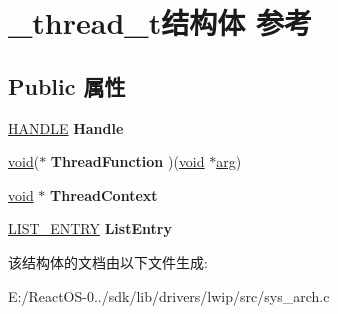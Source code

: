 \hypertarget{struct__thread__t}{}\section{\+\_\+thread\+\_\+t结构体 参考}
\label{struct__thread__t}
\subsection*{Public 属性}
\begin{DoxyCompactItemize}
\item 
\mbox{\label{struct__thread__t_a6a1ca8de95e7f8b5a7f56e4715771a3b}} 
\hyperlink{interfacevoid}{H\+A\+N\+D\+LE} {\bfseries Handle}
\item 
\mbox{\label{struct__thread__t_a62944413e55352f92edc17313b77e942}} 
\hyperlink{interfacevoid}{void}($\ast$ {\bfseries Thread\+Function} )(\hyperlink{interfacevoid}{void} $\ast$\hyperlink{interfacevoid}{arg})
\item 
\mbox{\label{struct__thread__t_a25455b7a03b4a23739802486644b118a}} 
\hyperlink{interfacevoid}{void} $\ast$ {\bfseries Thread\+Context}
\item 
\mbox{\label{struct__thread__t_af67dcff51d54be962ea4ede261b6c19c}} 
\hyperlink{struct___l_i_s_t___e_n_t_r_y}{L\+I\+S\+T\+\_\+\+E\+N\+T\+RY} {\bfseries List\+Entry}
\end{DoxyCompactItemize}


该结构体的文档由以下文件生成\+:\begin{DoxyCompactItemize}
\item 
E\+:/\+React\+O\+S-\/0../sdk/lib/drivers/lwip/src/sys\+\_\+arch.\+c\end{DoxyCompactItemize}
